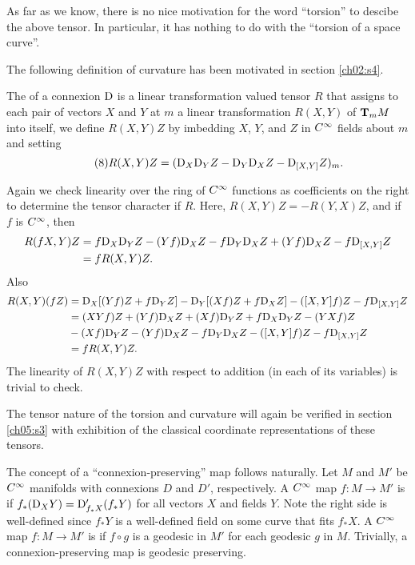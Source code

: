 \documentclass[../main]{subfiles}
\begin{document}
As far as we know, there is no nice motivation for the word ``torsion'' to descibe the above tensor. In particular, it has nothing to do with the ``torsion of a space curve''.

The following definition of curvature has been motivated in section \ref{ch02:s4}.

The  of a connexion $\connection$ is a linear transformation valued tensor $R$ that assigns to each pair of vectors $X$ and $Y$ at $m$ a linear transformation $R(X,Y)$ of $\tangentspace{M}{m}$ into itself, we define $R(X,Y)Z$ by imbedding $X$, $Y$, and $Z$ in $\CInfty$ fields about $m$ and setting
\begin{equation}\label{eq:ch05.8}
\tag{8}
R(X,Y)Z = (\connection_X \connection_Y Z - \connection_Y \connection_X Z - \connection_{[X,Y]} Z)_m.
\end{equation}

Again we check linearity over the ring of $\CInfty$ functions as coefficients on the right to determine the tensor character if $R$. Here, $R(X,Y)Z = -R(Y,X)Z$, and if $f$ is $\CInfty$, then
\begin{align*}
R(fX,Y)Z &= f\connection_X \connection_Y Z - (Yf)\connection_X Z - f \connection_Y \connection_X Z + (Yf)\connection_X Z - f\connection_{[X,Y]}Z \\&= fR(X,Y)Z.    
\end{align*}
Also
\begin{align*}
    R(X,Y)(fZ) &= \connection_X[(Yf)Z + f\connection_Y Z] - \connection_Y[(Xf)Z + f\connection_X Z] - ([X,Y]f)Z - f\connection_{[X,Y]}Z \\
    &= (XYf)Z + (Yf)\connection_X Z + (Xf)\connection_Y Z + f\connection_X \connection_Y Z - (YXf)Z\\ & - (Xf)\connection_Y Z - (Yf)\connection_X Z - f \connection_Y \connection_X Z - ([X,Y]f)Z - f\connection_{[X,Y]} Z \\
    &= fR(X,Y)Z.
\end{align*}
The linearity of $R(X,Y)Z$ with respect to addition (in each of its variables) is trivial to check.

The tensor nature of the torsion and curvature will again be verified in section \ref{ch05:s3} with exhibition of the classical coordinate representations of these tensors.

The concept of a ``connexion-preserving'' map follows naturally. Let $M$ and $M'$ be $\CInfty$ manifolds with connexions $D$ and $D'$, respectively. A $\CInfty$ map \newline $f\colon M \longrightarrow M'$ is  if $f_*(\connection_X Y) = \connection'_{f_* X}(f_* Y)$ for all vectors $X$ and fields $Y$. Note the right side is well-defined since $f_* Y$ is a well-defined field on some curve that fits $f_* X$. A $\CInfty$ map $f \colon M \longrightarrow M'$ is  if $f \circ g$ is a geodesic in $M'$ for each geodesic $g$ in $M$. Trivially, a connexion-preserving map is geodesic preserving.
\end{document}
